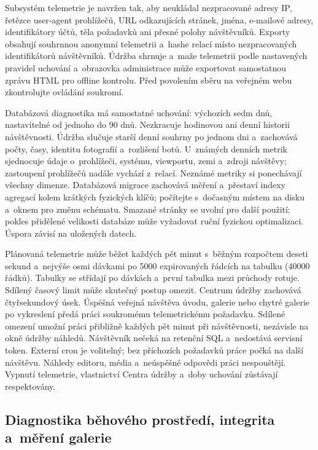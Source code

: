\documentclass[11pt,a4paper]{article}
\begin{document}
Subsystém telemetrie je navržen tak, aby neukládal nezpracované adresy IP,
řetězce user-agent prohlížečů, URL odkazujících stránek, jména, e-mailové
adresy, identifikátory účtů, těla požadavků ani přesné polohy návštěvníků.
Exporty obsahují souhrnnou anonymní telemetrii a~hashe relací místo
nezpracovaných identifikátorů návštěvníků. Údržba shrnuje a~maže telemetrii
podle nastavených pravidel uchování a~obrazovka administrace může exportovat
samostatnou zprávu HTML pro offline kontrolu. Před povolením sběru na veřejném
webu zkontrolujte ovládání soukromí.

Databázová diagnostika má samostatné uchování: výchozích sedm dnů, nastavitelné
od jednoho do 90 dnů. Nezkracuje hodinovou ani denní historii návštěvnosti.
Údržba slučuje starší denní souhrny po jednom dni a~zachovává počty, časy,
identitu fotografií a~rozlišení botů. U~známých denních metrik sjednocuje údaje
o~prohlížeči, systému, viewportu, zemi a~zdroji návštěvy; zastoupení prohlížečů
nadále vychází z~relací. Neznámé metriky si ponechávají všechny dimenze.
Databázová migrace zachovává měření a~přestaví indexy agregací kolem krátkých
fyzických klíčů; počítejte s~dočasným místem na disku a~oknem pro změnu
schématu.
Smazané stránky se uvolní pro další použití; pokles přidělené velikosti databáze
může vyžadovat ruční fyzickou optimalizaci. Úspora závisí na uložených datech.

Plánovaná telemetrie může běžet každých pět minut s~běžným rozpočtem deseti
sekund a~nejvýše osmi dávkami po 5000 expirovaných řádcích na tabulku (40000
řádků).
Tabulky se střídají po dávkách a~první tabulka mezi průchody rotuje. Sdílený
časový
limit může skutečný postup omezit. Centrum údržby zachovává čtyřsekundový úsek.
Úspěšná veřejná návštěva úvodu, galerie nebo chytré galerie po vykreslení předá
práci soukromému telemetrickému požadavku. Sdílené omezení umožní práci
přibližně
každých pět minut při návštěvnosti, nezávisle na okně údržby náhledů. Návštěvník
nečeká na retenční SQL a~nedostává servisní token. Externí cron je volitelný;
bez příchozích požadavků práce počká na další návštěvu. Náhledy editoru, média
a~neúspěšné odpovědi práci nespouštějí. Vypnutí telemetrie, vlastnictví Centra
údržby a~doby uchování zůstávají respektovány.

\subsection{Diagnostika běhového prostředí, integrita a~měření galerie}
\end{document}
